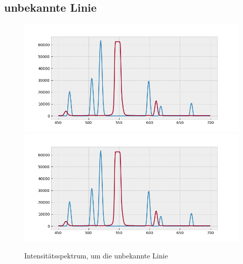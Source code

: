     \subsection{unbekannte Linie}
        \begin{myframe}{\subsecname}
            \begin{minipage}{.3\textwidth}
                \begin{figure}
                    \centering
                    \includegraphics[height=.32\textheight, trim={1.2cm 0 17.5cm 5cm}, clip]{img/wl}
                    \includegraphics[height=.32\textheight, trim={10cm 0 5cm 5cm}, clip]{img/wl}
                    \caption{Intensit\"atsspektrum, um die unbekannte Linie}
                \end{figure}
            \end{minipage}
        \end{myframe}
